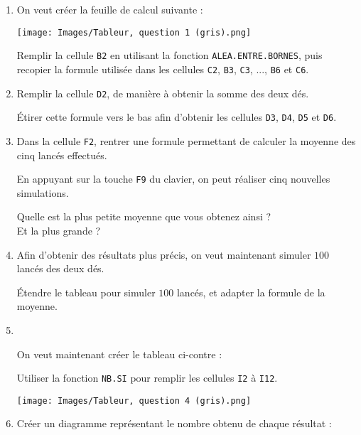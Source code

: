 \documentclass[
	classe=$2^{de}$
]{informatique}
\begin{document}
\begin{enumerate}
	\item On veut créer la feuille de calcul suivante :

	      \begin{center}
		      \texttt{[image: Images/Tableur, question 1 (gris).png]}
	      \end{center}

	      Remplir la cellule \texttt{B2} en utilisant la fonction \texttt{ALEA.ENTRE.BORNES}, puis recopier la formule utilisée dans les cellules \texttt{C2}, \texttt{B3}, \texttt{C3}, ..., \texttt{B6} et \texttt{C6}.
	\item Remplir la cellule \texttt{D2}, de manière à obtenir la somme des deux dés.

	      Étirer cette formule vers le bas afin d'obtenir les cellules \texttt{D3}, \texttt{D4}, \texttt{D5} et \texttt{D6}.
	\item Dans la cellule \texttt{F2}, rentrer une formule permettant de calculer la moyenne des cinq lancés effectués.

	      En appuyant sur la touche \texttt{F9} du clavier, on peut réaliser cinq nouvelles simulations.

	      Quelle est la plus petite moyenne que vous obtenez ainsi ?  \\
	      Et la plus grande ? 
	\item Afin d'obtenir des résultats plus précis, on veut maintenant simuler $100$ lancés des deux dés.

	      Étendre le tableau pour simuler $100$ lancés, et adapter la formule de la moyenne.
	\item \

	      \begin{minipage}{0.5\textwidth}
		      On veut maintenant créer le tableau ci-contre :

		      Utiliser la fonction \texttt{NB.SI} pour remplir les cellules \texttt{I2} à \texttt{I12}.
	      \end{minipage}\hspace{0.2\textwidth}
	      \begin{minipage}{0.45\textwidth}
		      \texttt{[image: Images/Tableur, question 4 (gris).png]}
	      \end{minipage}

	\item Créer un diagramme représentant le nombre obtenu de chaque résultat :


\end{enumerate}
\end{document}
